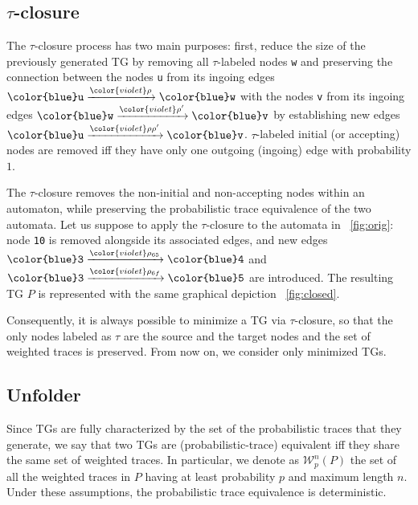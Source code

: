 \subsection{$\tau$-closure}\label{sec:clos}
The $\tau$-closure process has two main purposes: first, reduce the size of the previously generated TG by removing all
$\tau$-labeled nodes \texttt{\color{blue}w} and preserving the connection between  the nodes \texttt{\color{blue}u}
from its ingoing edges   $\texttt{\color{blue}u}\xrightarrow{\color{violet}\rho}\texttt{\color{blue}w}$ with the nodes \texttt{\color{blue}v} from its ingoing edges   $\texttt{\color{blue}w}\xrightarrow{\color{violet}\rho'}\texttt{\color{blue}v}$ by establishing new edges $\texttt{\color{blue}u}\xrightarrow{\color{violet}\rho\rho'}\texttt{\color{blue}v}$. $\tau$-labeled initial (or accepting) nodes are removed iff they have only one outgoing (ingoing) edge with probability $1$.

\begin{example}
	The $\tau$-closure removes the non-initial and non-accepting nodes within an automaton, while preserving the probabilistic trace equivalence of the two automata. Let us suppose to apply the $\tau$-closure to the automata in \figurename~\ref{fig:orig}: node \texttt{\color{blue}10} is removed alongside its associated edges, and new edges $\texttt{\color{blue}3}\xrightarrow{\color{violet}\rho_{65}}\texttt{\color{blue}4}$ and $\texttt{\color{blue}3}\xrightarrow{\color{violet}\rho_{6f}}\texttt{\color{blue}5}$ are introduced. The resulting TG $P$ is represented with the same graphical depiction \figurename~\ref{fig:closed}.
\end{example}
%
Consequently, it is always possible to minimize a TG  via $\tau$-closure, so that the only nodes labeled as $\tau$
are the source and the target nodes and the set of weighted traces is preserved. From now on, we consider only minimized TGs.

\subsection{Unfolder}\label{sec:unrav}
Since TGs are fully characterized by the set of the probabilistic traces that they generate,  we say that two TGs are
(probabilistic-trace) equivalent iff they share the same set of weighted traces. In particular, we denote as $\mathcal{W}_p^n(P)$ the set of all the weighted traces in $P$ having at least probability $p$ and maximum length $n$. Under these assumptions, the probabilistic trace equivalence is deterministic.

